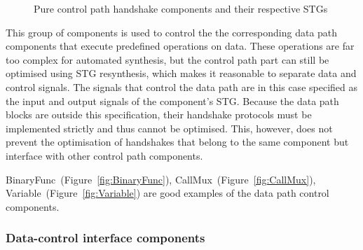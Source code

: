 \begin{figure}

\caption{Pure control path handshake components and their respective STGs}
\end{figure}


This group of components is used to control the the corresponding
data path components that execute predefined operations on data. These
operations are far too complex for automated synthesis, but the control
path part can still be optimised using STG resynthesis, which makes
it reasonable to separate data and control signals. The signals that
control the data path are in this case specified as the input and
output signals of the component's STG. Because the data path blocks
are outside this specification, their handshake protocols must be
implemented strictly and thus cannot be optimised. This, however,
does not prevent the optimisation of handshakes that belong to the
same component but interface with other control path components.

BinaryFunc~(Figure~\ref{fig:BinaryFunc}), CallMux~(Figure~\ref{fig:CallMux}),
Variable~(Figure~\ref{fig:Variable}) are good examples of the data
path control components.


\subsubsection{Data-control interface components}

